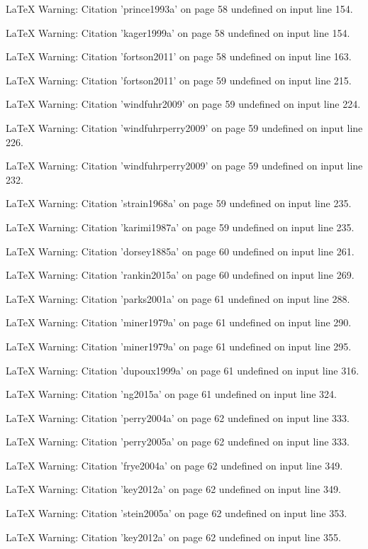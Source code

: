 LaTeX Warning: Citation 'prince1993a' on page 58 undefined on input line 154.


LaTeX Warning: Citation 'kager1999a' on page 58 undefined on input line 154.


LaTeX Warning: Citation 'fortson2011' on page 58 undefined on input line 163.


LaTeX Warning: Citation 'fortson2011' on page 59 undefined on input line 215.


LaTeX Warning: Citation 'windfuhr2009' on page 59 undefined on input line 224.


LaTeX Warning: Citation 'windfuhrperry2009' on page 59 undefined on input line 226.


LaTeX Warning: Citation 'windfuhrperry2009' on page 59 undefined on input line 232.


LaTeX Warning: Citation 'strain1968a' on page 59 undefined on input line 235.


LaTeX Warning: Citation 'karimi1987a' on page 59 undefined on input line 235.


LaTeX Warning: Citation 'dorsey1885a' on page 60 undefined on input line 261.


LaTeX Warning: Citation 'rankin2015a' on page 60 undefined on input line 269.


LaTeX Warning: Citation 'parks2001a' on page 61 undefined on input line 288.


LaTeX Warning: Citation 'miner1979a' on page 61 undefined on input line 290.


LaTeX Warning: Citation 'miner1979a' on page 61 undefined on input line 295.


LaTeX Warning: Citation 'dupoux1999a' on page 61 undefined on input line 316.


LaTeX Warning: Citation 'ng2015a' on page 61 undefined on input line 324.


LaTeX Warning: Citation 'perry2004a' on page 62 undefined on input line 333.


LaTeX Warning: Citation 'perry2005a' on page 62 undefined on input line 333.


LaTeX Warning: Citation 'frye2004a' on page 62 undefined on input line 349.


LaTeX Warning: Citation 'key2012a' on page 62 undefined on input line 349.


LaTeX Warning: Citation 'stein2005a' on page 62 undefined on input line 353.


LaTeX Warning: Citation 'key2012a' on page 62 undefined on input line 355.


